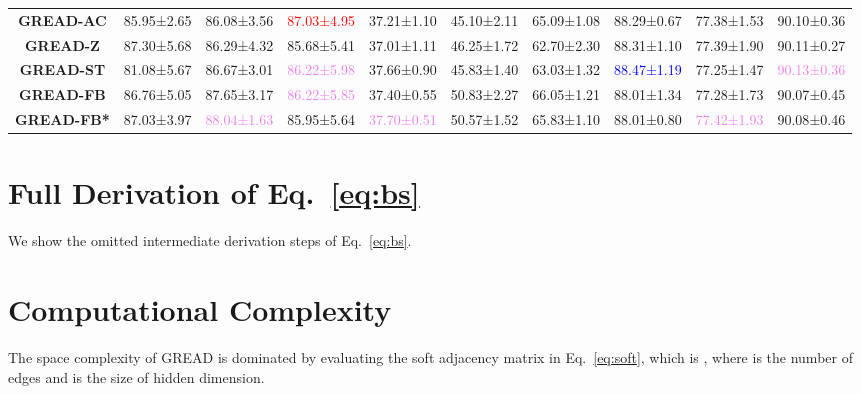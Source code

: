 \documentclass{article}
\theoremstyle{plain}
\theoremstyle{definition}
\theoremstyle{remark}
\newcommand{\std}{\scriptsize{}}
\newcommand{\BEST}[1]{\textcolor{red}{#1}}
\newcommand{\SECOND}[1]{\textcolor{blue}{#1}}
\newcommand{\THIRD}[1]{\textcolor{violet}{#1}}
\begin{document}
\begin{table}[ht]
\begin{tabular}{c ccccccccc}
        \textbf{GREAD-AC}
                    & 85.95\std{±2.65} & 86.08\std{±3.56} & \BEST{87.03\std{±4.95}} 
                    & 37.21\std{±1.10} & 45.10\std{±2.11} & 65.09\std{±1.08} 
                    & 88.29\std{±0.67} & 77.38\std{±1.53} & 90.10\std{±0.36}\\
        \textbf{GREAD-Z} 
                    & 87.30\std{±5.68} & 86.29\std{±4.32} & 85.68\std{±5.41} 
                    & 37.01\std{±1.11} & 46.25\std{±1.72} & 62.70\std{±2.30} 
                    & 88.31\std{±1.10} & 77.39\std{±1.90} & 90.11\std{±0.27}\\
        \textbf{GREAD-ST} 
                        & 81.08\std{±5.67} & 86.67\std{±3.01} & \THIRD{86.22\std{±5.98}}
                        & 37.66\std{±0.90} & 45.83\std{±1.40} & 63.03\std{±1.32} 
                        & \SECOND{88.47\std{±1.19}} & 77.25\std{±1.47} & \THIRD{90.13\std{±0.36}}\\
        \textbf{GREAD-FB}   
                        & 86.76\std{±5.05} & 87.65\std{±3.17} & \THIRD{86.22\std{±5.85}} 
                        & 37.40\std{±0.55} & 50.83\std{±2.27} & 66.05\std{±1.21} 
                        & 88.01\std{±1.34} & 77.28\std{±1.73} & 90.07\std{±0.45}\\
        \textbf{GREAD-FB*}   
                        & 87.03\std{±3.97} & \THIRD{88.04\std{±1.63}} & 85.95\std{±5.64} 
                        & \THIRD{37.70\std{±0.51}} & 50.57\std{±1.52} & 65.83\std{±1.10} 
                        & 88.01\std{±0.80} & \THIRD{77.42\std{±1.93}} &  90.08\std{±0.46}\\
\bottomrule
    \end{tabular}
    \label{tab:result_full}
\end{table}

\pagebreak

\section{Full Derivation of Eq.~\eqref{eq:bs}}\label{a:bs}
We show the omitted intermediate derivation steps of Eq.~\eqref{eq:bs}.



\section{Computational Complexity}\label{a:comp}
The space complexity of GREAD is dominated by evaluating the soft adjacency matrix in Eq.~\eqref{eq:soft}, which is , where  is the number of edges and  is the size of hidden dimension.
\end{document}
